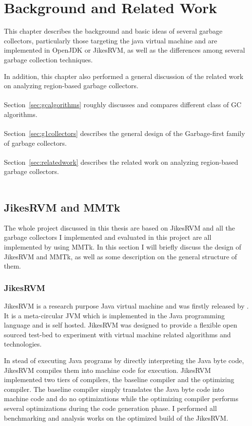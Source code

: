 \chapter{Background and Related Work}
\label{cha:background}

This chapter describes the background and basic ideas of several garbage collectors,
particularly those targeting the java virtual machine and are implemented in OpenJDK or JikesRVM,
as well as the differences among several garbage collection techniques.

In addition, this chapter also performed a general discussion of the related work
on analyzing region-based garbage collectors.
\\\\
Section~\ref{sec:gcalgorithms} roughly discusses and compares different class of GC algorithms.
\\\\
Section~\ref{sec:g1collectors} describes the general design of the Garbage-first family of garbage collectors.
\\\\
Section~\ref{sec:relatedwork} describes the related work on analyzing region-based garbage collectors.
\\\\

\section{JikesRVM and MMTk}

The whole project discussed in this thesis are based on JikesRVM and all the garbage collectors
I implemented and evaluated in this project are all implemented by using MMTk.
In this section I will briefly discuss the design of JikesRVM and MMTk,
as well as some description on the general structure of them.

\subsection{JikesRVM}

JikesRVM is a research purpose Java virtual machine and was firstly released by \cite{alpern2005jikes}. It is a meta-circular JVM
which is implemented in the Java programming language and is self hosted.
JikesRVM was designed to provide a flexible open sourced test-bed to
experiment with virtual machine related algorithms and technologies.

In stead of executing Java programs by directly interpreting the Java byte code,
JikesRVM compiles them into machine code for execution.
JikesRVM implemented two tiers of compilers, the baseline compiler and the optimizing compiler.
The baseline compiler simply translates the Java byte code into machine code and do no
optimizations while the optimizing compiler performs several optimizations during the
code generation phase. I performed all benchmarking and analysis works on the
optimized build of the JikesRVM.

